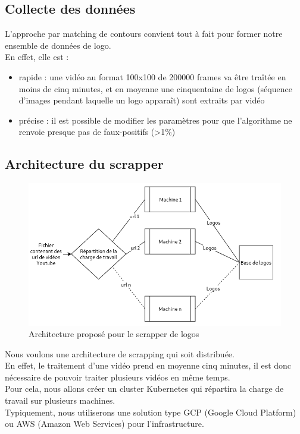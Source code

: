 \documentclass[11pt]{article}
\begin{document}
\subsection{Collecte des données}
\label{sec:org6fa13af}
L'approche par matching de contours convient tout à fait pour former notre ensemble de données de logo.\\

En effet, elle est :\\
\begin{itemize}
\item rapide : une vidéo au format 100x100 de 200000 frames va être traîtée en moins de cinq minutes, et en moyenne une cinquentaine de logos (séquence d'images pendant laquelle un logo apparaît) sont extraits par vidéo\\
\item précise : il est possible de modifier les paramètres pour que l'algorithme ne renvoie presque pas de faux-positifs (>1\%)\\
\end{itemize}

\subsection{Architecture du scrapper}
\label{sec:org96dd45d}
\begin{figure}[htbp]
\centering
\includegraphics[width=15cm]{arch_scrap.png}
\caption{Architecture proposé pour le scrapper de logos}
\end{figure}
Nous voulons une architecture de scrapping qui soit distribuée.\\
En effet, le traitement d'une vidéo prend en moyenne cinq minutes, il est donc nécessaire de pouvoir traiter plusieurs vidéos en même temps.\\
Pour cela, nous allons créer un cluster Kubernetes qui répartira la charge de travail sur plusieurs machines.\\
Typiquement, nous utiliserons une solution type GCP (Google Cloud Platform) ou AWS (Amazon Web Services) pour l'infrastructure.\\
\end{document}
